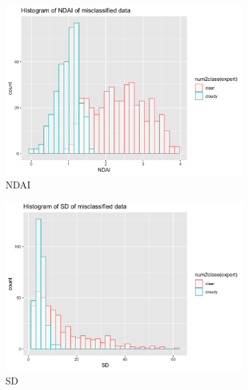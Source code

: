 \documentclass[jou]{apa}%
\begin{document}
\begin{figure}[H]
\hspace*{-.5cm}\begin{subfigure}{0.4\columnwidth}
    \includegraphics[scale=.1]{NDAImis}
    \caption{NDAI}
    \label{fig:1}
  \end{subfigure}\hfill %
\begin{subfigure}{0.4\columnwidth} \hspace*{-1cm}
    \includegraphics[scale=.1]{SDmis}
    \caption{SD}
    \label{fig:2}
  \end{subfigure}
\hspace*{-.5cm}\begin{subfigure}{0.4\columnwidth}

\end{subfigure}
\end{figure}
\end{document}
